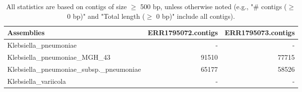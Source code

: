 \documentclass[12pt,a4paper]{article}
\begin{document}
\begin{table}[ht]
\begin{center}
\caption{All statistics are based on contigs of size $\geq$ 500 bp, unless otherwise noted (e.g., "\# contigs ($\geq$ 0 bp)" and "Total length ($\geq$ 0 bp)" include all contigs).}
\begin{tabular}{|l*{2}{|r}|}
\hline
Assemblies & ERR1795072.contigs & ERR1795073.contigs \\ \hline
Klebsiella\_pneumoniae & - & - \\ \hline
Klebsiella\_pneumoniae\_MGH\_43 & 91510 & 77715 \\ \hline
Klebsiella\_pneumoniae\_subsp.\_pneumoniae & 65177 & 58526 \\ \hline
Klebsiella\_variicola & - & - \\ \hline
\end{tabular}
\end{center}
\end{table}
\end{document}
